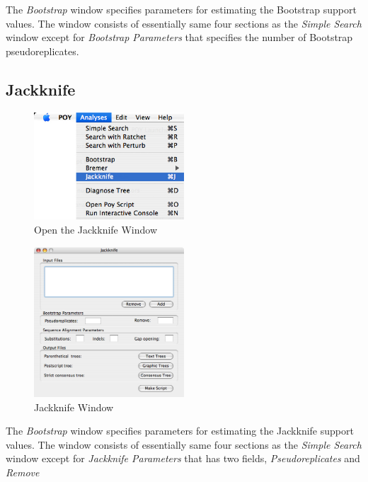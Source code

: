 The \emph{Bootstrap} window specifies parameters
for estimating the Bootstrap support values. The window consists
of essentially same four sections as the \emph{Simple Search} window
except for \emph{Bootstrap Parameters} that specifies the number
of Bootstrap pseudoreplicates.

\subsection{Jackknife}
\begin{figure}[htpb]
    \begin{center}
        \includegraphics[width=0.5\textwidth]{figures/Jackknife_Menu.jpg}
    \end{center}
    \caption{Open the Jackknife Window}
    \label{fig:jackknife_menu}
\end{figure}

\begin{figure}[htpb]
    \begin{center}
        \includegraphics[width=0.5\textwidth]{figures/Jackknife_Window.jpg}
    \end{center}
    \caption{Jackknife Window}
    \label{fig:jackknife_window}
\end{figure}

The \emph{Bootstrap} window specifies parameters for estimating the
Jackknife support values. The window consists of essentially same
four sections as the \emph{Simple Search} window except for
\emph{Jackknife Parameters} that has two fields, \emph{Pseudoreplicates}
and \emph{Remove}

